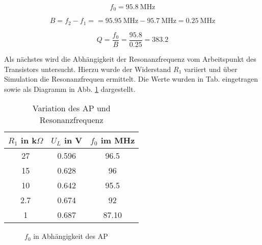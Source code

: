 \begin{equation*}
    f_0 = \SI{95.8}{\mega\hertz}
\end{equation*}

\begin{equation*}
    B = f_2 - f_1 =  = \SI{95.95}{\mega\hertz} - \SI{95.7}{\mega\hertz} = \SI{0.25}{\mega\hertz}
\end{equation*}

\begin{equation}
    Q = \frac{f_0}{B} = \frac{95.8}{0.25} = 383.2
\end{equation}

Als nächstes wird die Abhängigkeit der Resonanzfrequenz vom Arbeitspunkt des Transistors untersucht. Hierzu wurde der Widerstand $R_1$ variiert und über Simulation die Resonanzfrequen ermittelt. Die Werte wurden in Tab. eingetragen sowie als Diagramm in Abb. \ref{fig_Kap2_09:AP} dargestellt.

\begin{table}[H]
\centering
\begin{tabular}{|c|c|c|} \hline
$R_1$ in k$\Omega$ & $U_L$ in V & $f_0$ im MHz \\ \hline
27 & 0.596 & 96.5 \\ \hline
15 & 0.628 & 96 \\ \hline
10 & 0.642 & 95.5 \\ \hline
2.7 & 0.674 & 92 \\ \hline
1 & 0.687 & 87.10 \\ \hline
\end{tabular}
\caption{Variation des AP und Resonanzfrequenz}
\label{tab_Kap2_02:AP} 
\end{table}

\begin{figure}[H]
	\centering \small
	
	\caption{$f_0$ in Abhängigkeit des AP}
	\label{fig_Kap2_09:AP}
\end{figure}



